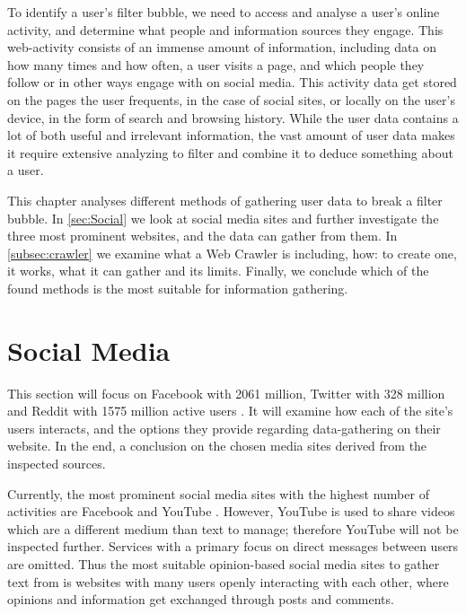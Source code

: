 
To identify a user's filter bubble, we need to access and analyse a user's
online activity, and determine what people and information sources they engage. This
web-activity consists of an immense amount of information, including data on how
many times and how often, a user visits a page, and which people they follow or
in other ways engage with on social media. This activity data get stored on the
pages the user frequents, in the case of social sites, or locally on the user's
device, in the form of search and browsing history. While the user data contains
a lot of both useful and irrelevant information, the vast amount of user data
makes it require extensive analyzing to filter and combine it to deduce
something about a user.\nl

This chapter analyses different methods of gathering user data to break a filter
bubble. In \autoref{sec:Social} we look at social media sites and further
investigate the three most prominent websites, and the data can gather from
them. In \autoref{subsec:crawler} we examine what a Web Crawler is including,
how: to create one, it works, what it can gather and its limits. Finally, we
conclude which of the found methods is the most suitable for information
gathering.

\section{Social Media}\label{sec:Social}
This section will focus on Facebook with 2061 million, Twitter with 328 million
and Reddit with 1575 million active users \citep{SocialMediaStats,
AdvertiseOnReddit}. It will examine how each of the site's users interacts, and
the options they provide regarding data-gathering on their website. In the end,
a conclusion on the chosen media sites derived from the inspected sources.

Currently, the most prominent social media sites with the highest number of
activities are Facebook and YouTube \citep{SocialMediaStats}. However, YouTube
is used to share videos which are a different medium than text to manage;
therefore YouTube will not be inspected further. Services with a primary focus
on direct messages between users are omitted. Thus the most suitable
opinion-based social media sites to gather text from is websites with many users
openly interacting with each other, where opinions and information get exchanged
through posts and comments.\nl